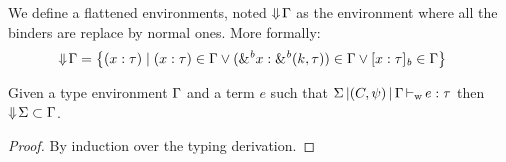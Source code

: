 We define a flattened environments, noted $\Downarrow\!\Gamma$ as the environment
where all the binders are replace by normal ones. More formally:
\begin{align*}
  \Downarrow\!\Gamma
  &= \left\{ (x : \tau) \mid
    (x : \tau)\in\Gamma
    \vee ({\&}^{\textit{b}}x : {\&}^{\textit{b}}(k,\tau))\in\Gamma
    \vee [x : \tau]_{\textit{b}}\in\Gamma
    \right\}
\end{align*}

\begin{lemma}
  \label{lemma:env:flat}
  Given a type environment $\Gamma$ and a term $e$ such
  that $\Sigma \operatorname{|} (C,\mathrm{\psi}) \operatorname{|} \Gamma \operatorname{\vdash_w} e : \tau$ 
  then $\Downarrow\!\Sigma \subset \Gamma$.
  \begin{proof}
    By induction over the typing derivation.
  \end{proof}
\end{lemma}




